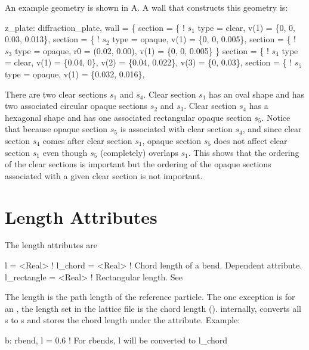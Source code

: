 An example geometry is shown in A. A wall that constructs this geometry is:
\begin{example}
  z_plate: diffraction_plate, wall = \{
    section = \{          ! \(s_1\) 
      type = clear,
      v(1) = \{0, 0, 0.03, 0.013\},
    section = \{          ! \(s_2\)
      type = opaque,
      v(1) = \{0, 0, 0.005\},
    section = \{          ! \(s_3\)
      type = opaque,
      r0 = (0.02, 0.00),
      v(1) = \{0, 0, 0.005\} \}
    section = \{          ! \(s_4\)
      type = clear, 
      v(1) = \{0.04, 0\}, v(2) = \{0.04, 0.022\},
      v(3) = \{0, 0.03\},
    section = \{          ! \(s_5\)
      type = opaque,
      v(1) = \{0.032, 0.016\},
\end{example}
There are two clear sections $s_1$ and $s_4$. Clear section $s_1$ has an oval shape and has two
associated circular opaque sections $s_2$ and $s_3$. Clear section $s_4$ has a hexagonal shape and
has one associated rectangular opaque section $s_5$. Notice that because opaque section $s_5$ is
associated with clear section $s_4$, and since clear section $s_4$ comes after clear section $s_1$,
opaque section $s_5$ does not affect clear section $s_1$ even though $s_5$ (completely) overlaps
$s_1$. This shows that the ordering of the clear sections is important but the ordering of the
opaque sections associated with a given clear section is not important.

\section{Length Attributes}
\label{s:l}

The length attributes are
\begin{example}
  l           = <Real>  ! 
  l_chord     = <Real>  ! Chord length of a bend. Dependent attribute.
  l_rectangle = <Real>  ! Rectangular length. See 
\end{example}
The length  is the path length of the reference particle. The one exception is for an
, the length  set in the lattice file is the chord length
(). internally, \bmad converts all s to s and stores the chord
length under the  attribute.  Example:
\begin{example}
  b: rbend, l = 0.6   ! For rbends, l will be converted to l_chord
\end{example}

